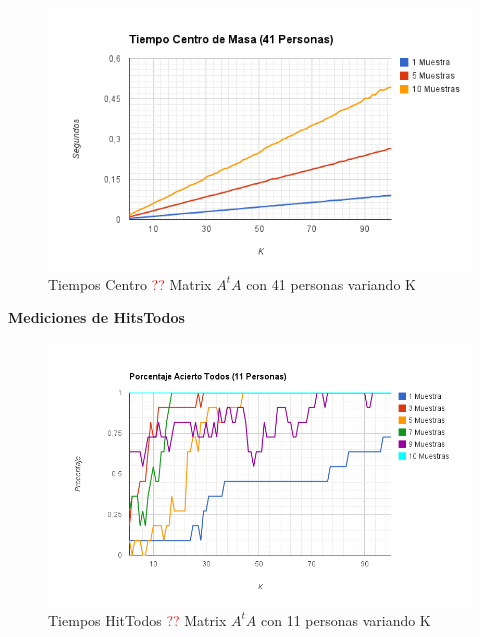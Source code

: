 \begin{figure}[H]
\includegraphics[width=1\textwidth]{img/imagei.png}
     \caption{Tiempos Centro \textcolor{red}{??} Matrix $A^tA$ con 41 personas variando K}
     \label{fig:figura1}
\end{figure}


\textbf{Mediciones de HitsTodos}

\begin{figure}[H]
\includegraphics[width=1\textwidth]{img/imagej.png}
     \caption{Tiempos HitTodos \textcolor{red}{??} Matrix $A^tA$ con 11 personas variando K}
     \label{fig:figura1}
\end{figure}

